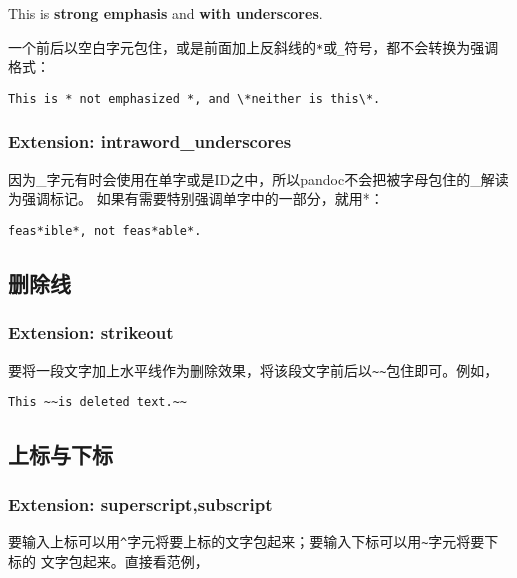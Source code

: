 \documentclass[fancyhdr,bookmark]{ctexbook}
\begin{document}
This is \textbf{strong emphasis} and \textbf{with underscores}.

一个前后以空白字元包住，或是前面加上反斜线的\lstinline!*!或\lstinline!_!符号，都不会转换为强调格式：

\begin{lstlisting}
This is * not emphasized *, and \*neither is this\*.
\end{lstlisting}

\subsubsection{Extension:
intraword\_underscores}\label{extension-intraword_underscores}

因为\_字元有时会使用在单字或是ID之中，所以pandoc不会把被字母包住的\_解读为强调标记。
如果有需要特别强调单字中的一部分，就用*：

\begin{lstlisting}
feas*ible*, not feas*able*.
\end{lstlisting}

\subsection{删除线}\label{ux5220ux9664ux7ebf}

\subsubsection{Extension: strikeout}\label{extension-strikeout}

要将一段文字加上水平线作为删除效果，将该段文字前后以\lstinline!~~!包住即可。例如，

\begin{lstlisting}
This ~~is deleted text.~~
\end{lstlisting}

\subsection{上标与下标}\label{ux4e0aux6807ux4e0eux4e0bux6807}

\subsubsection{Extension:
superscript,subscript}\label{extension-superscriptsubscript}

要输入上标可以用\lstinline!^!字元将要上标的文字包起来；要输入下标可以用\lstinline!~!字元将要下标的
文字包起来。直接看范例，
\end{document}
